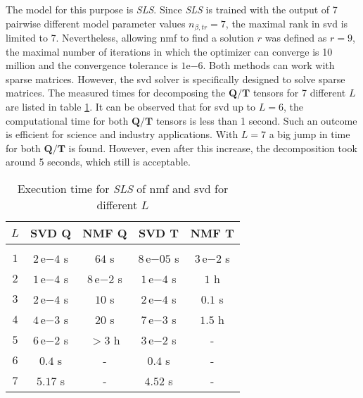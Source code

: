 The model for this purpose is \emph{SLS}. Since \emph{SLS} is trained with the output of 7 pairwise different model parameter values $n_{\beta,tr} = 7$, the maximal rank in \gls{svd} is limited to 7.
Nevertheless, allowing \gls{nmf} to find a solution $r$ was defined as $r=9$, the maximal number of iterations in which the optimizer can converge is 10 million and the convergence tolerance is $1\mathrm{e}{-6}$.
Both methods can work with sparse matrices. 
However, the \gls{svd} solver is specifically designed to solve sparse matrices.
The measured times for decomposing the $\bm Q / \bm T$ tensors for 7 different $L$ are listed in table \ref{tab_6_NMF_SVD}.
It can be observed that for \gls{svd} up to $L=6$, the computational time for both $\bm Q / \bm T$ tensors is less than 1 second.
Such an outcome is efficient for science and industry applications.
With $L=7$ a big jump in time for both $\bm Q / \bm T$ is found.
However, even after this increase, the decomposition took around 5 seconds, which still is acceptable.\newline 

\begin{table}
    \centering
    \begin{tabular}{c| c c |c c  }
        \textbf{$L$} &\textbf{SVD} $\bm Q$ & \textbf{NMF} $\bm Q$
        &\textbf{SVD} $\bm T$ & \textbf{NMF} $\bm T$\\
        \hline \\
        [-0.8em]
         $1$  & $2 \,\mathrm{e}{-4}$ s  & $64$ s & $8 \, \mathrm{e}{-05}$ s & $3 \, \mathrm{e}{-2}$  s \\

         $2$  & $1 \, \mathrm{e}{-4}$ s  & $8 \, \mathrm{e}{-2}$ s  & $1 \, \mathrm{e}{-4}$ s & $1$ h   \\

         $3$  & $2 \, \mathrm{e}{-4}$ s  & $10$ s  & $2 \, \mathrm{e}{-4}$ s & $0.1$ s \\

         $4$  & $4 \, \mathrm{e}{-3}$ s  & $20$ s & $7 \, \mathrm{e}{-3}$ s & $1.5$ h \\

         $5$  & $6 \, \mathrm{e}{-2}$ s  & $> 3$ h   & $3 \, \mathrm{e}{-2}$ s & -   \\

         $6$  & $0.4$ s & -     & $0.4$ s  & -    \\

         $7$  & $5.17$ s & -      & $4.52$ s & -  
    \end{tabular}
    \caption{Execution time for \emph{SLS} of \gls{nmf} and \gls{svd} for different $L$ }
    \label{tab_6_NMF_SVD}
\end{table}


